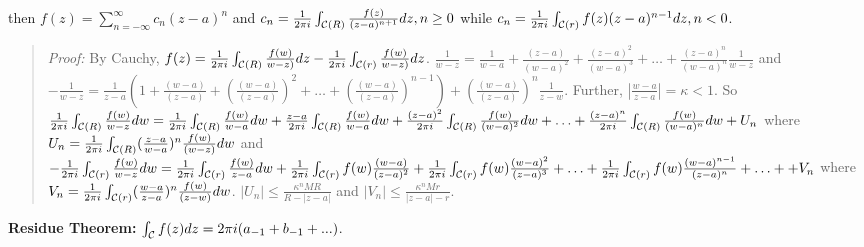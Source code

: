 then  $f(z)= \sum_{n= - \infty}^{\infty} c_n (z-a)^n$ and
$c_n= {\frac 1 {2 \pi i}} \int_{{\cal C}(R)} {\frac {f(z)}{(z-a)^{n+1}}} dz, n \geq 0$ while
$c_n= {\frac 1 {2 \pi i}} \int_{{\cal C}(r)} f(z) (z-a)^{n-1} dz, n < 0$.
\begin{quote}
\emph{Proof:}
By Cauchy,
$f(z)= {\frac 1 {2 \pi i}} \int_{{\cal C}(R)} {\frac {f(w)}{w-z)}} dz -
{\frac 1 {2 \pi i}} \int_{{\cal C}(r)} {\frac {f(w)}{w-z)}} dz$.
${\frac 1 {w-z}}=
{\frac 1 {w-a} } +
{\frac {(z-a)} {(w-a)^2}}+
{\frac {(z-a)^2} {(w-a)^3}}+ \ldots +
{\frac {(z-a)^n} {(w-a)^{n}}} {\frac 1 {w-z}}$ and
$-{\frac 1 {w-z}}=
{\frac 1 {z-a} } (1 +
{\frac {(w-a)} {(z-a)}}+
({\frac {(w-a)} {(z-a)}})^2+ \ldots +
({\frac {(w-a)} {(z-a)}})^{n-1})+ 
({\frac {(w-a)} {(z-a)}})^{n} {\frac 1 {z-w}}$.  Further,
$|{\frac {w-a}{z-a}}|= \kappa < 1$.  So
$
{\frac 1 {2 \pi i}} \int_{{\cal C}(R)} {\frac {f(w)} {w-z}} dw=
{\frac 1 {2 \pi i}} \int_{{\cal C}(R)} {\frac {f(w)} {w-a}} dw +
{\frac {z-a} {2 \pi i}} \int_{{\cal C}(R)} {\frac {f(w)} {w-a}} dw +
{\frac {(z-a)^2} {2 \pi i}} \int_{{\cal C}(R)} {\frac {f(w)} {(w-a)^2}} dw + \ldots +
{\frac {(z-a)^n} {2 \pi i}} \int_{{\cal C}(R)} {\frac {f(w)} {(w-a)^n}} dw + U_n$  where
$U_n= {\frac 1 {2 \pi i}} \int_{{\cal C}(R)} ({\frac {z-a} {w-a}})^n{\frac {f(w)} {(w-z)}} dw$
and
$
-{\frac 1 {2 \pi i}} \int_{{\cal C}(r)} {\frac {f(w)} {w-z}} dw=
{\frac 1 {2 \pi i}} \int_{{\cal C}(r)} {\frac {f(w)} {z-a}} dw +
{\frac 1 {2 \pi i}} \int_{{\cal C}(r)} f(w) {\frac {(w-a)} {(z-a)^2}} +
{\frac 1 {2 \pi i}} \int_{{\cal C}(r)} f(w) {\frac {(w-a)^2} {(z-a)^3}} + \ldots +
{\frac 1 {2 \pi i}} \int_{{\cal C}(r)} f(w) {\frac {(w-a)^{n-1}} {(z-a)^n}} + \ldots +
+ V_n$  
where
$V_n= {\frac 1 {2 \pi i}} \int_{{\cal C}(r)} ({\frac {w-a} {z-a}})^n{\frac {f(w)} {(z-w)}} dw$.
$|U_n| \leq  {\frac {\kappa^n M R} {R- |z-a|}}$ and
$|V_n| \leq  {\frac {\kappa^n M r} {|z-a|-r}}$.
\end{quote}
{\bf Residue Theorem:}
$\int_{\cal C} f(z) dz = 2 \pi i (a_{-1} + b_{-1} + ... )$.
\begin{quote}
\end{quote}
